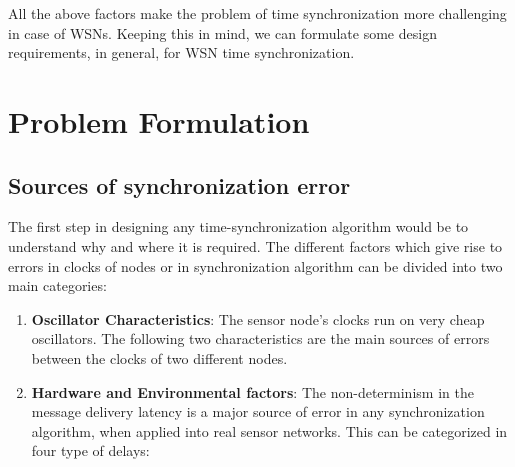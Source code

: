 \documentclass[a4paper,10pt]{report}
\begin{document}
All the above factors make the problem of time synchronization more
challenging in case of WSNs. Keeping this in mind, we can formulate
some design requirements, in general, for WSN time synchronization.
\chapter{\textbf{Problem Formulation}}
\section{\textbf{Sources of synchronization error}}
The first step in designing any time-synchronization algorithm would
be to understand why and where it is required. The different factors
which give rise to errors in clocks of nodes or in synchronization
algorithm can be divided into two main categories:
\begin{enumerate}
\item \textbf{Oscillator Characteristics}: The sensor node's clocks run on very cheap oscillators.
      The following two characteristics are the main sources of errors between the clocks
      of two different nodes.
\item \textbf{Hardware and Environmental factors}: The non-determinism in the message delivery latency
      is a major source of error in any synchronization algorithm, when applied into real
      sensor networks. This can be categorized in four type of
      delays:
\end{enumerate}
\end{document}
